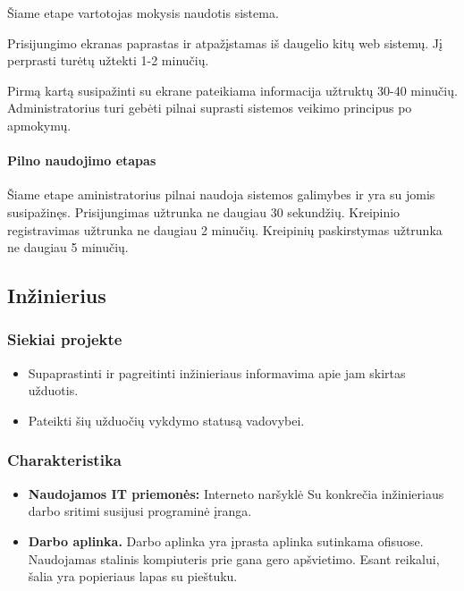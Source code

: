 			Šiame etape vartotojas mokysis naudotis sistema.
			
			Prisijungimo ekranas paprastas ir atpažįstamas iš daugelio kitų web sistemų.
			Jį perprasti turėtų užtekti 1-2 minučių.

			Pirmą kartą susipažinti su ekrane pateikiama informacija užtruktų 30-40 minučių.
			Administratorius turi gebėti pilnai suprasti sistemos veikimo principus po apmokymų.
			
			\setcounter{tocdepth}{5} \setcounter{secnumdepth}{5}
			
			\paragraph{Pilno naudojimo etapas}
			
			Šiame etape aministratorius pilnai naudoja sistemos galimybes ir yra su jomis susipažinęs.
			Prisijungimas užtrunka ne daugiau 30 sekundžių. Kreipinio registravimas užtrunka ne daugiau 2 minučių.
			Kreipinių paskirstymas užtrunka ne daugiau 5 minučių.
			
	\subsection{Inžinierius}
	
		\subsubsection{Siekiai projekte}
	
		\begin{itemize}
			\item Supaprastinti ir pagreitinti inžinieriaus informavima apie jam skirtas užduotis.
			\item Pateikti šių užduočių vykdymo statusą vadovybei.
		\end{itemize}
		
		
		\subsubsection{Charakteristika}
		
		\begin{itemize}
			\item \textbf{Naudojamos IT priemonės:}
				\subitem Interneto naršyklė
				\subitem Su konkrečia inžinieriaus darbo sritimi susijusi programinė įranga.
			\item \textbf{Darbo aplinka.}
			Darbo aplinka yra įprasta aplinka sutinkama ofisuose.
			Naudojamas stalinis kompiuteris prie gana gero apšvietimo.
			Esant reikalui, šalia yra popieriaus lapas su pieštuku.
		\end{itemize}
			
